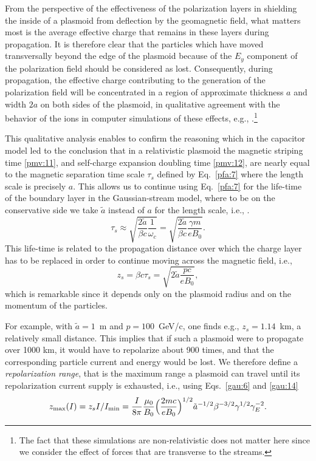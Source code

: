 \documentclass [12pt,a4paper,     ]{report} %
\begin{document}
   From the perspective of the effectiveness of the polarization layers in shielding the inside of a plasmoid from deflection by the geomagnetic field, what matters most is the average effective charge that remains in these layers during propagation.   It is therefore clear that the particles which have moved transversally beyond the edge of the plasmoid because of the $E_y$ component of the polarization field should be considered as lost.  Consequently, during propagation, the effective charge contributing to the generation of the polarization field will be concentrated in a region of approximate thickness $a$ and width $2a$ on both sides of the plasmoid, in qualitative agreement with the behavior of the ions in computer simulations of these effects, e.g., \cite[Fig.4]{GALVE1991-}.\footnote{The fact that these simulations are non-relativistic does not matter here since we consider the effect of forces that are transverse to the streams.}

   This qualitative analysis enables to confirm the reasoning which in the capacitor model led to the conclusion that in a relativistic plasmoid the magnetic striping time \eqref{pmv:11}, and self-charge expansion doubling time \eqref{pmv:12}, are nearly equal to the magnetic separation time scale $\tau_s$ defined by Eq.~\eqref{pfa:7} where the length scale is precisely $a$. This allows us to continue using Eq.~\eqref{pfa:7} for the life-time of the boundary layer in the Gaussian-stream model, where to be on the conservative side we take $\tilde{a}$ instead of $a$ for the length scale, i.e., . 
%
\begin{equation}\label{gau:13} 
   \tau_s \approx \sqrt{ \frac{2\tilde{a}}{\beta c} \frac{1}{\omega_c} }
           =      \sqrt{ \frac{2\tilde{a}}{\beta c} \frac{\gamma m}{eB_0} }.
\end{equation}
%
This life-time is related to the propagation distance over which the charge layer has to be replaced in order to continue moving across the magnetic field, i.e.,
%
\begin{equation}\label{gau:14} 
   z_s = \beta c \tau_s   =  \sqrt{ 2\tilde{a} \frac{p c}{eB_0} },
\end{equation}
%
which is remarkable since it depends only on the plasmoid radius and on the momentum of the particles.


  For example,  with $\tilde{a}=1$~m and $p=100$~GeV/c, one finds e.g., $z_s=1.14$~km, a relatively small distance.  This implies that if such a plasmoid were to propagate over 1000 km, it would have to repolarize about 900 times, and that the corresponding particle current and energy would be lost.  We therefore define a \emph{repolarization range}, that is the maximum range a plasmoid can travel until its repolarization current supply is exhausted, i.e., using Eqs.~\eqref{gau:6} and \eqref{gau:14}
%
\begin{equation}\label{gau:15} 
   z_{\text{max}}(I) = z_s I/I_{\text{min}}  =
              \frac{I}{8 \pi} \frac{\mu_0}{B_0}
              \Bigl( \frac{2m c}{eB_0} \Bigr)^{1/2}
              \tilde{a}^{-1/2}
              \beta^{-3/2}\gamma^{1/2}\gamma_E^{-2}.
\end{equation}
%
\end{document}
